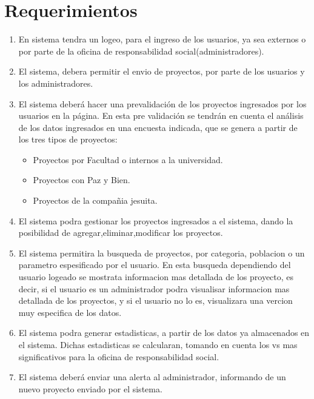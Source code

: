 \documentclass[journal]{IEEEtran}
\begin{document}
\begin{center}
\end{center}


\section{\textbf{Requerimientos}}

\begin{enumerate}
\item
En sistema tendra un logeo, para el ingreso de los usuarios, ya sea externos o por parte de la oficina de responsabilidad social(administradores).\\
\item
El sistema, debera permitir el envio de proyectos, por parte de los usuarios y los administradores.\\
\item
El sistema deberá hacer una prevalidaci\'on de los proyectos ingresados
por los usuarios en la p\'agina. En esta pre validaci\'on se tendr\'an en
cuenta el an\'alisis de los datos ingresados en una encuesta indicada, que se genera a partir de los tres tipos de proyectos:
\begin{itemize}
\item
Proyectos por Facultad o internos a la universidad.
\item
Proyectos con Paz y Bien.
\item
Proyectos de la compa\~nia jesuita.\\
\end{itemize}
\item
El sistema podra gestionar los proyectos ingresados a el sistema, dando la posibilidad de agregar,eliminar,modificar los proyectos.\\
\item
El sistema permitira la busqueda de proyectos, por categoria, poblacion o un parametro espesificado por el usuario. En esta busqueda dependiendo del usuario logeado se mostrata informacion mas detallada de los proyecto, es decir, si el usuario es un administrador podra visualisar informacion mas detallada de los proyectos, y si el usuario no lo es, visualizara una vercion muy especifica de los datos.\\
\item
El sistema podra generar estadisticas, a partir de los datos ya almacenados en el sistema. Dichas estadisticas se calcularan, tomando en cuenta los vs mas significativos para la oficina de responsabilidad social.\\ 
\item
El sistema deberá enviar una alerta al administrador, informando de
un nuevo proyecto enviado por el sistema.
\end{enumerate}
\end{document}
